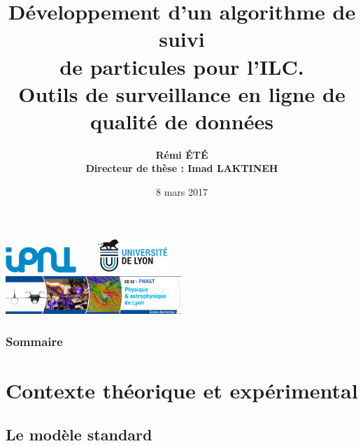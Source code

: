 \documentclass[8pt]{beamer}
\title[Séminaire 2ieme année]{Développement d'un algorithme de suivi \\ de particules pour l'ILC. \\{\normalsize Outils de surveillance en ligne de qualité de données}}
\institute{\normalsize Institut de Physique Nucléaire de Lyon}
\author[R. Eté]{{\large \bf Rémi \'ET\'E} \\ {\bf Directeur de thèse : Imad LAKTINEH}}
\date{8 mars 2017}
\begin{document}

  \begin{frame}
    \titlepage
    \begin{center}
      \includegraphics[width=0.2\textwidth]{logo/logo_ipnl.jpg} ~~~
      \includegraphics[width=0.2\textwidth]{logo/logo-univ-lyon.png} ~~~
      \includegraphics[width=0.5\textwidth]{logo/logo-edphast.jpg}
    \end{center}
  \end{frame}


  \begin{frame}
  \frametitle{Sommaire}
    \tableofcontents
  \end{frame}


  \section{Contexte théorique et expérimental}

  \begin{frame}
  \frametitle{\secname}
    \tableofcontents[currentsection]
  \end{frame}


  \subsection{Le modèle standard}
\end{document}
